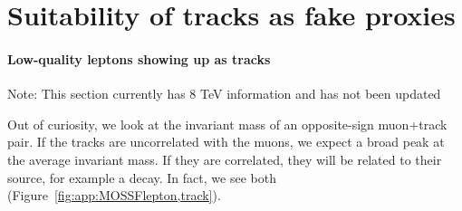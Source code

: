 \chapter{Suitability of tracks as fake proxies}
\label{app:MOSSFlepton,track}

\subsubsection{Low-quality leptons showing up as tracks}
Note: This section currently has 8 TeV information and has not been updated

Out of curiosity, we look at the invariant mass of an opposite-sign muon+track pair. If the tracks are uncorrelated with the muons, we expect a broad peak at the average invariant mass. If they are correlated, they will be related to their source, for example a \Z decay. In fact, we see both (Figure~\ref{fig:app:MOSSFlepton,track}).

